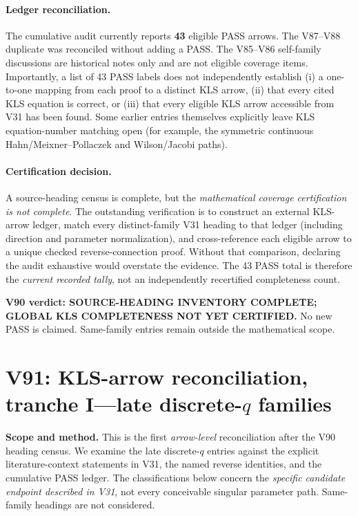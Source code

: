 \documentclass[11pt]{article}
\begin{document}
\paragraph{Ledger reconciliation.} The cumulative audit currently reports \textbf{43} eligible PASS arrows. The V87--V88 duplicate was reconciled without adding a PASS. The V85--V86 self-family discussions are historical notes only and are not eligible coverage items. Importantly, a list of 43 PASS labels does not independently establish (i) a one-to-one mapping from each proof to a distinct KLS arrow, (ii) that every cited KLS equation is correct, or (iii) that every eligible KLS arrow accessible from V31 has been found. Some earlier entries themselves explicitly leave KLS equation-number matching open (for example, the symmetric continuous Hahn/Meixner--Pollaczek and Wilson/Jacobi paths).

\paragraph{Certification decision.} A source-heading census is complete, but the \emph{mathematical coverage certification is not complete}. The outstanding verification is to construct an external KLS-arrow ledger, match every distinct-family V31 heading to that ledger (including direction and parameter normalization), and cross-reference each eligible arrow to a unique checked reverse-connection proof. Without that comparison, declaring the audit exhaustive would overstate the evidence. The 43 PASS total is therefore the \emph{current recorded tally}, not an independently recertified completeness count.

\noindent\textbf{V90 verdict: SOURCE-HEADING INVENTORY COMPLETE; GLOBAL KLS COMPLETENESS NOT YET CERTIFIED.} No new PASS is claimed. Same-family entries remain outside the mathematical scope.


\section{V91: KLS-arrow reconciliation, tranche I---late discrete-$q$ families}
\noindent\textbf{Scope and method.} This is the first \emph{arrow-level} reconciliation after the V90 heading census. We examine the late discrete-$q$ entries against the explicit literature-context statements in V31, the named reverse identities, and the cumulative PASS ledger. The classifications below concern the \emph{specific candidate endpoint described in V31}, not every conceivable singular parameter path. Same-family headings are not considered.
\end{document}
